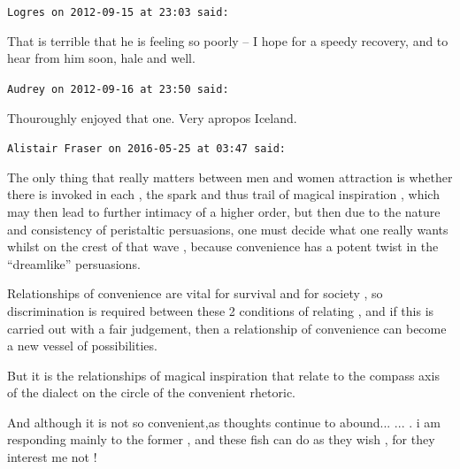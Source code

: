 \begin{footnotesize}
\begin{sffamily}
\texttt{Logres on 2012-09-15 at 23:03 said:}

That is terrible that he is feeling so poorly -- I hope for a speedy recovery, and to hear from him soon, hale and well.

\hfill

\texttt{Audrey on 2012-09-16 at 23:50 said:}

Thouroughly enjoyed that one. Very apropos Iceland.

\hfill

\texttt{Alistair Fraser on 2016-05-25 at 03:47 said:}

The only thing that really matters between men and women attraction is whether there is invoked in each , the spark and thus trail of magical inspiration , which may then lead to further intimacy of a higher order, but then due to the nature and consistency of peristaltic persuasions, one must decide what one really wants whilst on the crest of that wave , because convenience has a potent twist in the ``dreamlike'' persuasions.

Relationships of convenience are vital for survival and for society , so discrimination is required between these 2 conditions of relating , and if this is carried out with a fair judgement, then a relationship of convenience can become a new vessel of possibilities.

But it is the relationships of magical inspiration that relate to the compass axis of the dialect on the circle of the convenient rhetoric.

And although it is not so convenient,as thoughts continue to abound... ... . i am responding mainly to the former , and these fish can do as they wish , for they interest me not !


\hfill

\end{sffamily}
\end{footnotesize}


